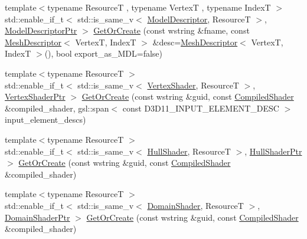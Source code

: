 \begin{DoxyCompactItemize}
\item 
{\footnotesize template$<$typename ResourceT , typename VertexT , typename IndexT $>$ }\\std\+::enable\+\_\+if\+\_\+t$<$ std\+::is\+\_\+same\+\_\+v$<$ \hyperlink{classmage_1_1rendering_1_1_model_descriptor}{Model\+Descriptor}, ResourceT $>$, \hyperlink{namespacemage_1_1rendering_a07260934fd7cb48a210873ae73e62911}{Model\+Descriptor\+Ptr} $>$ \hyperlink{classmage_1_1rendering_1_1_resource_manager_a2e9c16757e4aa09c8544289650f3ce20}{Get\+Or\+Create} (const wstring \&fname, const \hyperlink{classmage_1_1rendering_1_1_mesh_descriptor}{Mesh\+Descriptor}$<$ VertexT, IndexT $>$ \&desc=\hyperlink{classmage_1_1rendering_1_1_mesh_descriptor}{Mesh\+Descriptor}$<$ VertexT, IndexT $>$(), bool export\+\_\+as\+\_\+\+M\+DL=false)
\item 
{\footnotesize template$<$typename ResourceT $>$ }\\std\+::enable\+\_\+if\+\_\+t$<$ std\+::is\+\_\+same\+\_\+v$<$ \hyperlink{classmage_1_1rendering_1_1_vertex_shader}{Vertex\+Shader}, ResourceT $>$, \hyperlink{namespacemage_1_1rendering_aaf704b9c54a4181f4950a1761de69dda}{Vertex\+Shader\+Ptr} $>$ \hyperlink{classmage_1_1rendering_1_1_resource_manager_a10abecc1fde6cccbae90e14d64b55727}{Get\+Or\+Create} (const wstring \&guid, const \hyperlink{classmage_1_1rendering_1_1_compiled_shader}{Compiled\+Shader} \&compiled\+\_\+shader, gsl\+::span$<$ const D3\+D11\+\_\+\+I\+N\+P\+U\+T\+\_\+\+E\+L\+E\+M\+E\+N\+T\+\_\+\+D\+E\+SC $>$ input\+\_\+element\+\_\+descs)
\item 
{\footnotesize template$<$typename ResourceT $>$ }\\std\+::enable\+\_\+if\+\_\+t$<$ std\+::is\+\_\+same\+\_\+v$<$ \hyperlink{namespacemage_1_1rendering_aa133f36cd1a81c87eedf962270a12f48}{Hull\+Shader}, ResourceT $>$, \hyperlink{namespacemage_1_1rendering_a6f33b2e1ea7f2ae3824dc7fb6875c655}{Hull\+Shader\+Ptr} $>$ \hyperlink{classmage_1_1rendering_1_1_resource_manager_aedf58d2d3f5436b06deb080b5324a1fb}{Get\+Or\+Create} (const wstring \&guid, const \hyperlink{classmage_1_1rendering_1_1_compiled_shader}{Compiled\+Shader} \&compiled\+\_\+shader)
\item 
{\footnotesize template$<$typename ResourceT $>$ }\\std\+::enable\+\_\+if\+\_\+t$<$ std\+::is\+\_\+same\+\_\+v$<$ \hyperlink{namespacemage_1_1rendering_a02bd57ea68f48dd6e0d37a1362ad1ea2}{Domain\+Shader}, ResourceT $>$, \hyperlink{namespacemage_1_1rendering_a85a8911c7c1e9e42bd7c3acbc2725076}{Domain\+Shader\+Ptr} $>$ \hyperlink{classmage_1_1rendering_1_1_resource_manager_adf60f2638d297cc7627a8806535cad17}{Get\+Or\+Create} (const wstring \&guid, const \hyperlink{classmage_1_1rendering_1_1_compiled_shader}{Compiled\+Shader} \&compiled\+\_\+shader)

\end{DoxyCompactItemize}
